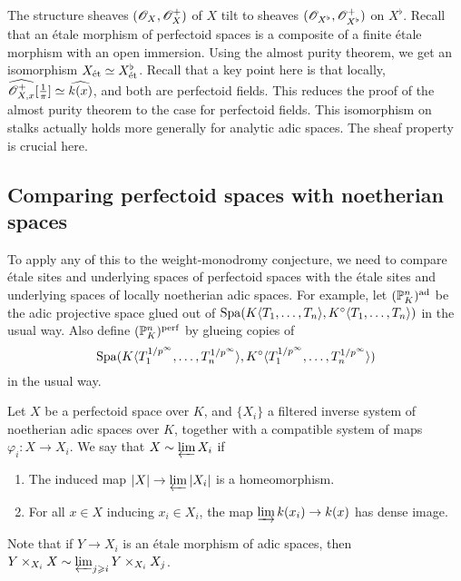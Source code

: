 The structure sheaves $(\mathscr{O}_X,\mathscr{O}_X^+)$ of $X$ tilt to sheaves 
$(\mathscr{O}_{X^\flat}, \mathscr{O}_{X^\flat}^+)$ on $X^\flat$. Recall that an \'etale 
morphism of perfectoid spaces is a composite of a finite \'etale morphism with 
an open immersion. Using the almost purity theorem, we get an isomorphism 
$X_{\textnormal{\'et}}\simeq X^\flat_{\textnormal{\'et}}$. Recall that a key point here is that locally, 
$\widehat{\mathscr{O}_{X,x}^+}[\frac 1 \pi] \simeq \widehat{k(x)}$, and both are perfectoid 
fields. This reduces the proof of the almost purity theorem to the case for 
perfectoid fields. This isomorphism on stalks actually holds more generally 
for analytic adic spaces. The sheaf property is crucial here. 





\subsection{Comparing perfectoid spaces with noetherian spaces}

To apply any of this to the weight-monodromy conjecture, we need to compare 
\'etale sites and underlying spaces of perfectoid spaces with the \'etale 
sites and underlying spaces of locally noetherian adic spaces. For example, 
let $(\mathbb{P}_K^n)^{\textnormal{ad}}$ be the adic projective space glued out of 
$\operatorname{Spa}(K\langle T_1,\dots,T_n\rangle,K^\circ\langle T_1,\dots,T_n\rangle)$ in 
the usual way. Also define $(\mathbb{P}_K^n)^{\textnormal{perf}}$ by glueing copies of 
\[
  \operatorname{Spa}(K\langle T_1^{1/p^\infty},\dots,T_n^{1/p^\infty}\rangle,K^\circ\langle T_1^{1/p^\infty},\dots,T_n^{1/p^\infty}\rangle)
\] 
in the usual way. 

\begin{definition}
Let $X$ be a perfectoid space over $K$, and $\{X_i\}$ a filtered inverse 
system of noetherian adic spaces over $K$, together with a compatible system 
of maps $\varphi_i :X\to X_i$. We say that $X\sim \varprojlim X_i$ if 
\begin{enumerate}
  \item The induced map $|X|\to \varprojlim |X_i|$ is a homeomorphism. 
  \item For all $x\in X$ inducing $x_i\in X_i$, the map 
    $\varinjlim k(x_i) \to k(x)$ has dense image. 
\end{enumerate}
\end{definition}

Note that if $Y\to X_i$ is an \'etale morphism of adic spaces, then 
$Y\times_{X_i} X\sim \varprojlim_{j\geqslant i} Y\times_{X_i} X_j$. 

